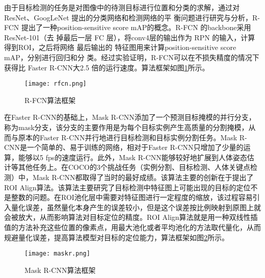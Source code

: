 由于目标检测的任务是对图像中的待测目标进行位置和分类的求解，通过对ResNet、GoogLeNet
提出的分类网络和检测网络的平
衡问题进行研究与分析，R-FCN 提出了一种position-sensitive score mAP的概念。R-FCN 的backbone采用ResNet-101（去
掉最后一层 FC 层），将conv4层的输出作为 RPN 的输入，计算得到ROI，之后将网络
最后输出的 特征图用来计算position-sensitive score mAP，分别进行回归和分
类。经过实验证明，R-FCN可以在不损失精度的情况下获得比 Faster R-CNN大2.5 倍的运行速度。算法框架如图\ref{rfcn}所示。

\begin{figure}[htbp]
    \centering
    \texttt{[image: rfcn.png]}
    \caption{R-FCN算法框架}
    \label{rfcn}
\end{figure}
在Faster R-CNN的基础上，Mask R-CNN添加了一个预测目标掩模的并行分支，称为mask分支，该分支的主要作用是为每个目标实例产生高质量的分割掩模，从而与原本的Faster R-CNN并行地进行目标检测和目标实例分割任务。Mask R-CNN是一个简单的、易于训练的网络，相对于Faster R-CNN只增加了少量的运算，能够以5 fps的速度运行。此外，Mask R-CNN能够较好地扩展到人体姿态估计等其他任务上。在COCO的3个挑战任务（实例分割、目标检测、人体关键点检测）中，Mask R-CNN都取得了当时的最好成绩。该算法主要的创新在于提出了ROI Align算法。该算法主要研究了目标检测中特征图上可能出现的目标的定位不是整数的问题。在ROI池化层中需要对特征图进行一定程度的缩放，该过程容易引入量化误差，虽然量化本身产生的误差较小，但是这个误差按比例映射到原图上就会被放大，从而影响算法对目标定位的精度。ROI Align算法就是用一种双线性插值的方法补充这些位置的像素点，用最大池化或者平均池化的方法取代量化，从而规避量化误差，提高算法模型对目标的定位能力，算法框架如图\ref{maskr}所示。

\begin{figure}[htbp]
    \centering
    \texttt{[image: maskr.png]}
    \caption{Mask R-CNN算法框架}
    \label{maskr}
\end{figure}

